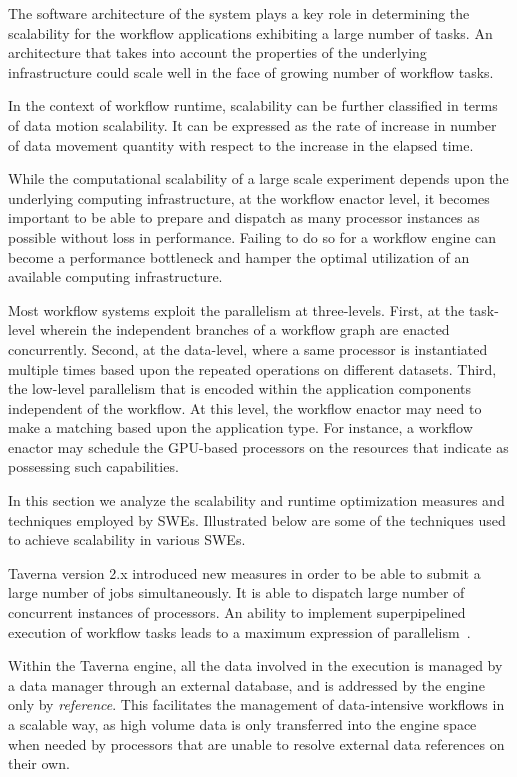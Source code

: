 The software architecture of the system plays a key role in determining the
scalability for the workflow applications exhibiting a large number of tasks.
An architecture that takes into account the properties of the underlying
infrastructure could scale well in the face of growing number of workflow
tasks.

In the context of workflow runtime, scalability can be further classified in
terms of data motion scalability. It can be expressed as the rate of increase
in number of data movement quantity with respect to the increase in the elapsed
time.

While the computational scalability of a large scale experiment depends upon
the underlying computing infrastructure, at the workflow enactor level, it
becomes important to be able to prepare and dispatch as many processor
instances as possible without loss in performance. Failing to do so for a
workflow engine can become a performance bottleneck and hamper the optimal
utilization of an available computing infrastructure.

Most workflow systems exploit the parallelism at three-levels. First, at the
task-level wherein the independent branches of a workflow graph are enacted
concurrently. Second, at the data-level, where a same processor is instantiated
multiple times based upon the repeated operations on different datasets. Third,
the low-level parallelism that is encoded within the application components
independent of the workflow. At this level, the workflow enactor may
need to make a matching based upon the application type. For instance, a
workflow enactor may schedule the GPU-based processors on the resources that
indicate as possessing such capabilities.

In this section we analyze the scalability and runtime optimization measures
and techniques employed by SWEs. Illustrated below are some of the techniques
used to achieve scalability in various SWEs.

Taverna version 2.x introduced new measures in order to be able to submit a
large number of jobs simultaneously. It is able to dispatch large number of
concurrent instances of processors. An ability to implement
superpipelined~\cite{hwang:1992} execution of workflow tasks leads to a maximum
expression of parallelism~\cite{pipeline}.

Within the Taverna engine, all the data involved in the execution is managed by
a data manager through an external database, and is addressed by the engine
only by \textit{reference}. This facilitates the management of data-intensive
workflows in a scalable way, as high volume data is only transferred into the
engine space when needed by processors that are unable to resolve external data
references on their own.

